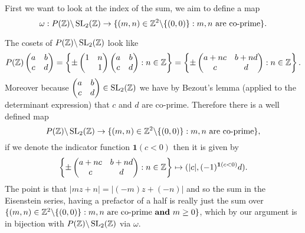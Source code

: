 First we want to look at the index of the sum, we aim to define a map
	\[\omega: P(\Z) \backslash \SL_2(\Z) \to  \{(m,n)\in \Z^2\backslash\{(0,0)\} : m,n \text{ are co-prime}\}.\]

	The cosets of \(P(\Z) \backslash \SL_2(\Z)\) look like
	\[P(\Z)\begin{pmatrix}
		a & b \\ c& d
	\end{pmatrix} = \left\{\pm\begin{pmatrix}
		1 & n \\&1
	\end{pmatrix}\begin{pmatrix}
	a & b \\ c& d
	\end{pmatrix} : n\in \Z\right\} = \left\{\pm\begin{pmatrix}
	a+nc & b+nd \\ c & d
	\end{pmatrix} : n\in \Z\right\}.\]
	Moreover because \(\begin{pmatrix}
		a & b \\ c& d
	\end{pmatrix}\in \SL_2(\Z)\) we have by Bezout's lemma (applied to the determinant expression) that \(c\) and \(d\) are co-prime. Therefore there is a well defined map 
	\[P(\Z) \backslash \SL_2(\Z) \to  \{(m,n)\in \Z^2\backslash\{(0,0)\} : m,n \text{ are co-prime}\},\]
	if we denote the indicator function \(\mathbf{1}(c<0)\) then it is given by 
	\[\left\{\pm\begin{pmatrix}
		a+nc & b+nd \\ c & d
	\end{pmatrix} : n\in \Z\right\}\mapsto (|c|,(-1)^{\mathbf{1}(c<0)}d).\]
	The point is that \(|mz + n| = |(-m)z + (-n)|\) and so the sum in the Eisenstein series, having a prefactor of a half is really just the sum over \( \{(m,n)\in \Z^2\backslash\{(0,0)\} : m,n \text{ are co-prime \textbf{and} }m\geq 0\}\), which by our argument is in bijection with \(P(\Z) \backslash \SL_2(\Z)\) via \(\omega\).
	

	

